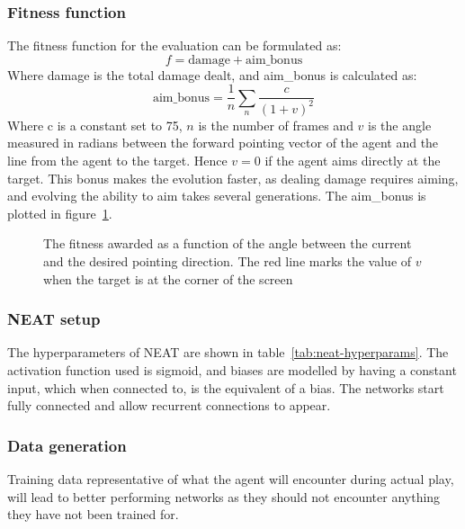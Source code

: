 \subsubsection{Fitness function}
The fitness function for the evaluation can be formulated as:
$$f = \text{damage} + \text{aim\_bonus}$$
Where damage is the total damage dealt, and aim\_bonus is calculated as:
$$ \text{aim\_bonus} = \frac{1}{n} \sum_{n} \frac{c}{(1+v)^2} $$
Where c is a constant set to 75, $n$ is the number of frames and $v$ is the angle measured in radians between the forward pointing vector of the agent and the line from the agent to the target. Hence $v = 0$ if the agent aims directly at the target. This bonus makes the evolution faster, as dealing damage requires aiming, and evolving the ability to aim takes several generations. The aim\_bonus is plotted in figure~\ref{fig:aim-bonus}.

\begin{figure}[h]
\centering
{}
\caption[Fitness function used for neuroevolution]{The fitness awarded as a function of the angle between the current and the desired pointing direction. The red line marks the value of $v$ when the target is at the corner of the screen}
\label{fig:aim-bonus}
\end{figure}

\subsubsection{NEAT setup}
The hyperparameters of NEAT are shown in table~\ref{tab:neat-hyperparams}. The activation function used is sigmoid, and biases are modelled by having a constant input, which when connected to, is the equivalent of a bias. The networks start fully connected and allow recurrent connections to appear.


\subsubsection{Data generation}
\label{subsub:data-gen}
Training data representative of what the agent will encounter during actual play, will lead to better performing networks as they should not encounter anything they have not been trained for.

